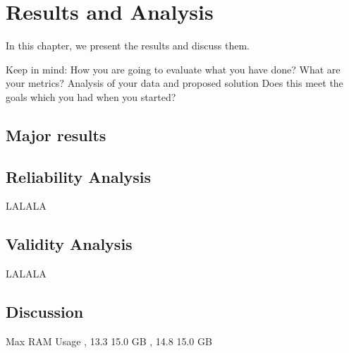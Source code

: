 \documentclass[a4paper,10pt,twocolumn]{article}
\numberwithin{figure}{section}
\numberwithin{table}{section}
\begin{document}
\newpage



\section{Results and Analysis}
In this chapter, we present the results and discuss them.

Keep in mind: How you are going to evaluate what you have done? What are your metrics?
Analysis of your data and proposed solution
Does this meet the goals which you had when you started?

\subsection{Major results}






\subsection{Reliability Analysis}
LALALA

\subsection{Validity Analysis}
LALALA


\subsection{Discussion}

Max RAM Usage , 13.3 15.0 GB , 14.8 15.0 GB 
       
\end{document}
